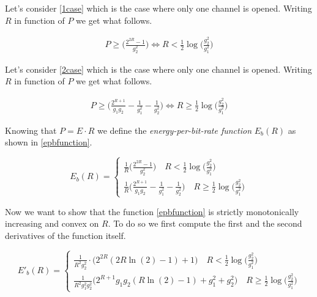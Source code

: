 Let's consider \eqref{1case} which is the case where only one channel is opened. Writing $R$ in function of $P$ we get what follows.

\begin{equation}
	\begin{gathered}
		P \geq \Big(\frac{2^{2R}-1}{g_2^2}\Big)
		\Leftrightarrow R < \frac{1}{2} \log\Big(\frac{g_2^2}{g_1^2}\Big)
	\end{gathered}
\end{equation}

Let's consider \eqref{2case} which is the case where only one channel is opened. Writing $R$ in function of $P$ we get what follows.

\begin{equation}
	\begin{gathered}
		P \geq \Big(\frac{2^{R+1}}{g_1g_2} -\frac{1}{g_1^2} - \frac{1}{g_2^2} \Big)
		\Leftrightarrow R \geq \frac{1}{2} \log\Big(\frac{g_2^2}{g_1^2}\Big)
	\end{gathered}
\end{equation}

Knowing that $P = E \cdot R$ we define the \textit{energy-per-bit-rate function} $E_b(R)$ as shown in \eqref{epbfunction}.

\begin{equation} E_b(R)=
	\begin{cases}
		\frac{1}{R}\Big(\frac{2^{2R}-1}{g_2^2}\Big) \quad R < \frac{1}{2} \log\Big(\frac{g_2^2}{g_1^2}\Big) \\
		\frac{1}{R} \Big(\frac{2^{R+1}}{g_1g_2} -\frac{1}{g_1^2} - \frac{1}{g_2^2} \Big) \quad R \geq \frac{1}{2} \log\Big(\frac{g_2^2}{g_1^2}\Big)
	\end{cases}
	\label{epbfunction}
\end{equation}

Now we want to show that the function \eqref{epbfunction} is strictly monotonically increasing and convex on $R$. To do so we first compute the first and the second derivatives of the function itself.

\begin{equation}
	E'_b(R)= \begin{cases}
		\frac{1}{R^2g_2^2}\cdot \Big(2^{2R}(2R\ln(2)-1)+1\Big) \quad R < \frac{1}{2} \log\Big(\frac{g_2^2}{g_1^2}\Big) \\
		\frac{1}{R^2g_1^2 g_2^2} \Big(2^{R+1} g_1 g_2 ( R \ln(2)-1)+g_1^2+g_2^2 \Big) \quad R \geq \frac{1}{2} \log\Big(\frac{g_2^2}{g_1^2}\Big)
\end{cases}
\end{equation}

